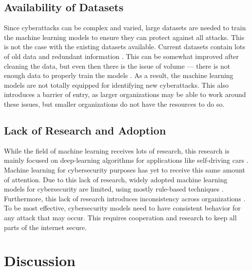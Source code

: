 \subsection{Availability of Datasets}
Since cyberattacks can be complex and varied, large datasets are needed to train the machine learning models to ensure they can protect against all attacks.
This is not the case with the existing datasets available.
Current datasets contain lots of old data and redundant information \cite{xin2018}.
This can be somewhat improved after cleaning the data, but even then there is the issue of volume --- there is not enough data to properly train the models \cite{xin2018}.
As a result, the machine learning models are not totally equipped for identifying new cyberattacks.
This also introduces a barrier of entry, as larger organizations may be able to work around these issues, but smaller organizations do not have the resources to do so.

\subsection{Lack of Research and Adoption}
While the field of machine learning receives lots of research, this research is mainly focused on deep-learning algorithms for applications like self-driving cars \cite{grandchallenge2019}.
Machine learning for cybersecurity purposes has yet to receive this same amount of attention.
Due to this lack of research, widely adopted machine learning models for cybersecurity are limited, using mostly rule-based techniques \cite{grandchallenge2019}.
Furthermore, this lack of research introduces inconsistency across organizations \cite{grandchallenge2019}.
To be most effective, cybersecurity models need to have consistent behavior for any attack that may occur.
This requires cooperation and research to keep all parts of the internet secure.

\section{Discussion}
